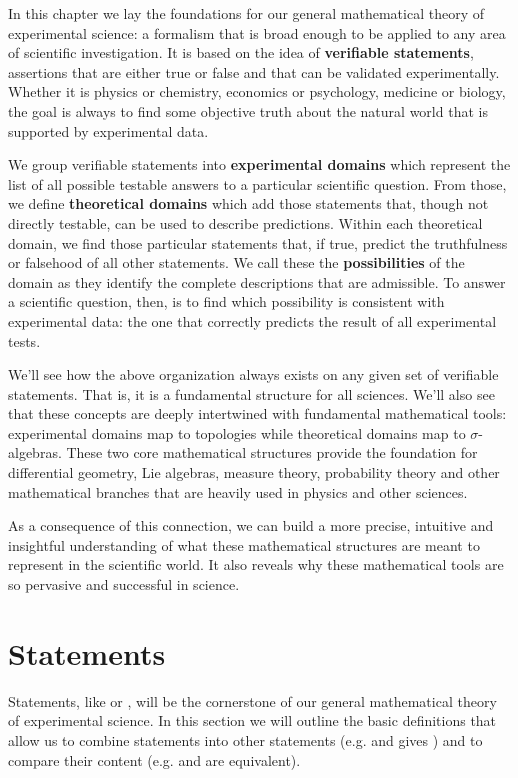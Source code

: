 \documentclass[11pt,letterpaper,fleqn]{memoir} %
\begin{document}
In this chapter we lay the foundations for our general mathematical theory of experimental science: a formalism that is broad enough to be applied to any area of scientific investigation. It is based on the idea of \textbf{verifiable statements}, assertions that are either true or false and that can be validated experimentally. Whether it is physics or chemistry, economics or psychology, medicine or biology, the goal is always to find some objective truth about the natural world that is supported by experimental data.

We group verifiable statements into \textbf{experimental domains} which represent the list of all possible testable answers to a particular scientific question. From those, we define \textbf{theoretical domains} which add those statements that, though not directly testable, can be used to describe predictions. Within each theoretical domain, we find those particular statements that, if true, predict the truthfulness or falsehood of all other statements. We call these the \textbf{possibilities} of the domain as they identify the complete descriptions that are admissible. To answer a scientific question, then, is to find which possibility is consistent with experimental data: the one that correctly predicts the result of all experimental tests.

We'll see how the above organization always exists on any given set of verifiable statements. That is, it is a fundamental structure for all sciences. We'll also see that these concepts are deeply intertwined with fundamental mathematical tools: experimental domains map to topologies while theoretical domains map to $\sigma$-algebras. These two core mathematical structures provide the foundation for differential geometry, Lie algebras, measure theory, probability theory and other mathematical branches that are heavily used in physics and other sciences.

As a consequence of this connection, we can build a more precise, intuitive and insightful understanding of what these mathematical structures are meant to represent in the scientific world. It also reveals why these mathematical tools are so pervasive and successful in science.

\section{Statements}

Statements, like  or , will be the cornerstone of our general mathematical theory of experimental science. In this section we will outline the basic definitions that allow us to combine statements into other statements (e.g.  and  gives ) and to compare their content (e.g.  and  are equivalent).
\end{document}
